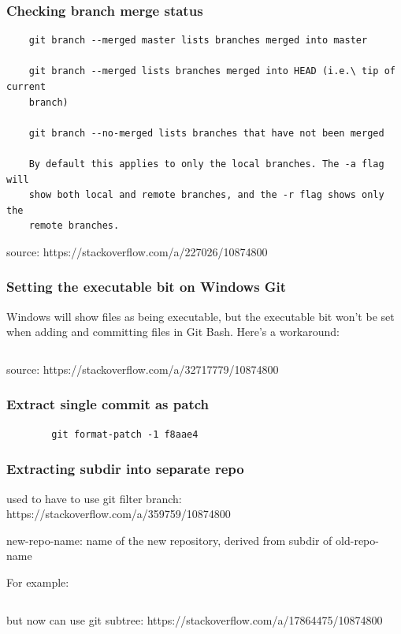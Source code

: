 \begin{frame}[fragile]
\frametitle{Checking branch merge status}
    \begin{verbatim}
    git branch --merged master lists branches merged into master

    git branch --merged lists branches merged into HEAD (i.e.\ tip of current
    branch)

    git branch --no-merged lists branches that have not been merged

    By default this applies to only the local branches. The -a flag will
    show both local and remote branches, and the -r flag shows only the
    remote branches.
    \end{verbatim}
    source: https://stackoverflow.com/a/227026/10874800
\end{frame}

\begin{frame}[fragile]
\frametitle{Setting the executable bit on Windows Git}
Windows will show files as being executable, but the executable bit won't be
set when adding and committing files in Git Bash.  Here's a workaround:

    \inputminted{bash}{set-executable-bit-on-windows-git.txt}
    source: https://stackoverflow.com/a/32717779/10874800
\end{frame}

\begin{frame}[fragile]
\frametitle{Extract single commit as patch}
    \begin{verbatim}
        git format-patch -1 f8aae4
    \end{verbatim}
\end{frame}

\begin{frame}[fragile]
\frametitle{Extracting subdir into separate repo}
used to have to use git filter branch:
    https://stackoverflow.com/a/359759/10874800

    new-repo-name: name of the new repository, derived from subdir of
    old-repo-name

For example:

    \inputminted{bash}{extract-subdir-into-own-repo-with-filter-branch.txt}

but now can use git subtree:
    https://stackoverflow.com/a/17864475/10874800

    \inputminted{bash}{extract-subdir-into-own-repo-with-git-subtree.txt}
\end{frame}

\appendix


